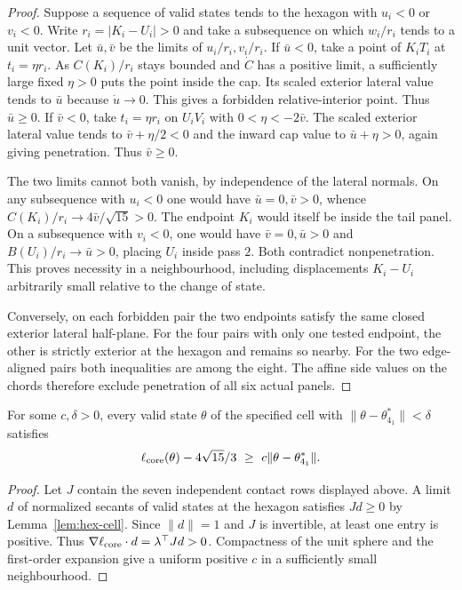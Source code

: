 \begin{proof}
Suppose a sequence of valid states tends to the hexagon with $u_i<0$ or $v_i<0$. Write $r_i=|K_i-U_i|>0$ and take a subsequence on which $w_i/r_i$ tends to a unit vector. Let $\bar u,\bar v$ be the limits of $u_i/r_i,v_i/r_i$. If $\bar u<0$, take a point of $K_iT_i$ at $t_i=\eta r_i$. As $C(K_i)/r_i$ stays bounded and $\dot C$ has a positive limit, a sufficiently large fixed $\eta>0$ puts the point inside the cap. Its scaled exterior lateral value tends to $\bar u$ because $\dot u\to0$. This gives a forbidden relative-interior point. Thus $\bar u\ge0$. If $\bar v<0$, take $t_i=\eta r_i$ on $U_iV_i$ with $0<\eta<-2\bar v$. The scaled exterior lateral value tends to $\bar v+\eta/2<0$ and the inward cap value to $\bar u+\eta>0$, again giving penetration. Thus $\bar v\ge0$.

The two limits cannot both vanish, by independence of the lateral normals. On any subsequence with $u_i<0$ one would have $\bar u=0,\bar v>0$, whence $C(K_i)/r_i\to4\bar v/\sqrt{15}>0$. The endpoint $K_i$ would itself be inside the tail panel. On a subsequence with $v_i<0$, one would have $\bar v=0,\bar u>0$ and $B(U_i)/r_i\to\bar u>0$, placing $U_i$ inside pass $2$. Both contradict nonpenetration. This proves necessity in a neighbourhood, including displacements $K_i-U_i$ arbitrarily small relative to the change of state.

Conversely, on each forbidden pair the two endpoints satisfy the same closed exterior lateral half-plane. For the four pairs with only one tested endpoint, the other is strictly exterior at the hexagon and remains so nearby. For the two edge-aligned pairs both inequalities are among the eight. The affine side values on the chords therefore exclude penetration of all six actual panels.
\end{proof}

\begin{corollary}\label{cor:hex-growth}
For some $c,\delta>0$, every valid state $\theta$ of the specified cell with $\|\theta-\theta^*_{4_1}\|<\delta$ satisfies
\[
 \core(\theta)-4\sqrt{15}/3\ \ge\ c\|\theta-\theta^*_{4_1}\|.
\]
\end{corollary}
\begin{proof}
Let $J$ contain the seven independent contact rows displayed above. A limit $d$ of normalized secants of valid states at the hexagon satisfies $Jd\ge0$ by Lemma~\ref{lem:hex-cell}. Since $\|d\|=1$ and $J$ is invertible, at least one entry is positive. Thus $\nabla\ell_{\mathrm{core}}\cdot d=\lambda^\top Jd>0$. Compactness of the unit sphere and the first-order expansion give a uniform positive $c$ in a sufficiently small neighbourhood.
\end{proof}

